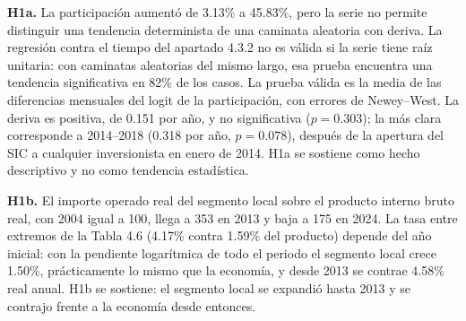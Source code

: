 
\textbf{H1a.} La participación aumentó de 3.13\% a 45.83\%, pero la serie no permite distinguir una tendencia determinista de una caminata aleatoria con deriva. La regresión contra el tiempo del apartado 4.3.2 no es válida si la serie tiene raíz unitaria: con caminatas aleatorias del mismo largo, esa prueba encuentra una tendencia significativa en 82\% de los casos. La prueba válida es la media de las diferencias mensuales del logit de la participación, con errores de Newey--West. La deriva es positiva, de 0.151 por año, y no significativa ($p=0.303$); la más clara corresponde a 2014--2018 (0.318 por año, $p=0.078$), después de la apertura del SIC a cualquier inversionista en enero de 2014. H1a se sostiene como hecho descriptivo y no como tendencia estadística.

\textbf{H1b.} El importe operado real del segmento local sobre el producto interno bruto real, con 2004 igual a 100, llega a 353 en 2013 y baja a 175 en 2024. La tasa entre extremos de la Tabla 4.6 (4.17\% contra 1.59\% del producto) depende del año inicial: con la pendiente logarítmica de todo el periodo el segmento local crece 1.50\%, prácticamente lo mismo que la economía, y desde 2013 se contrae 4.58\% real anual. H1b se sostiene: el segmento local se expandió hasta 2013 y se contrajo frente a la economía desde entonces.




